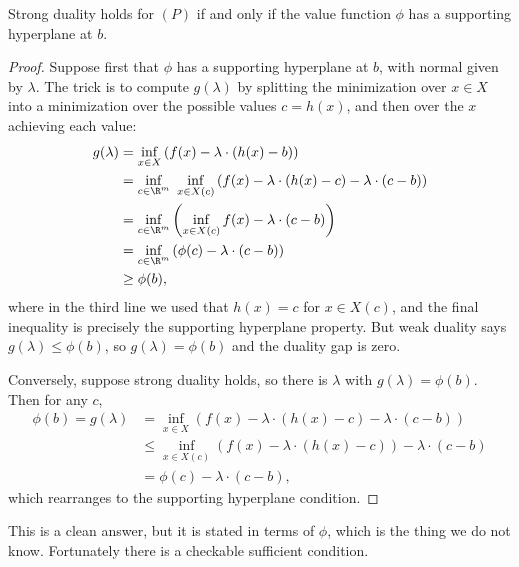 \begin{theorem}
    Strong duality holds for $(P)$ if and only if the value function $\phi$ has a supporting hyperplane at $b$.
\end{theorem}
\begin{proof}
    Suppose first that $\phi$ has a supporting hyperplane at $b$, with normal given by $\lambda$. The trick is to compute $g(\lambda)$ by splitting the minimization over $x \in X$ into a minimization over the possible values $c = h(x)$, and then over the $x$ achieving each value:
    \begin{align*}
        g(\lambda) &= \inf_{x \in X}\left(f(x) - \lambda\cdot(h(x) - b)\right)\\
        &= \inf_{c \in \R^m}\ \inf_{x \in X(c)}\left(f(x) - \lambda\cdot(h(x) - c) - \lambda\cdot(c - b)\right)\\
        &= \inf_{c \in \R^m}\left(\inf_{x \in X(c)}f(x) - \lambda\cdot(c - b)\right)\\
        &= \inf_{c \in \R^m}\left(\phi(c) - \lambda\cdot(c - b)\right)\\
        &\geq \phi(b),
    \end{align*}
    where in the third line we used that $h(x) = c$ for $x \in X(c)$, and the final inequality is precisely the supporting hyperplane property. But weak duality says $g(\lambda) \leq \phi(b)$, so $g(\lambda) = \phi(b)$ and the duality gap is zero.

    Conversely, suppose strong duality holds, so there is $\lambda$ with $g(\lambda) = \phi(b)$. Then for any $c$,
    \begin{align*}
        \phi(b) = g(\lambda) &= \inf_{x \in X}\left(f(x) - \lambda\cdot(h(x) - c) - \lambda\cdot(c - b)\right)\\
        &\leq \inf_{x \in X(c)}\left(f(x) - \lambda\cdot(h(x) - c)\right) - \lambda\cdot(c-b) \\
        &= \phi(c) - \lambda\cdot(c - b),
    \end{align*}
    which rearranges to the supporting hyperplane condition.
\end{proof}

This is a clean answer, but it is stated in terms of $\phi$, which is the thing we do not know. Fortunately there is a checkable sufficient condition.

